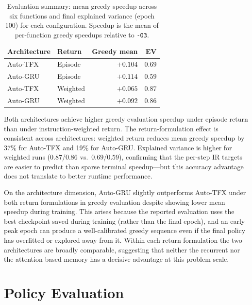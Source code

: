 \documentclass[conference]{IEEEtran}
\newcommand{\opt}[1]{\texttt{-O#1}}
\begin{document}
\begin{table}[t]
\caption{Evaluation summary: mean greedy speedup across six functions and
final explained variance (epoch 100) for each configuration.
Speedup is the mean of per-function greedy speedups relative to \opt{3}.}
\label{tab:arch-comparison}
\centering
\begin{tabular}{llrr}
\toprule
Architecture & Return & Greedy mean & EV \\
\midrule
Auto-TFX & Episode  & $+0.104$ & $0.69$ \\
Auto-GRU & Episode  & $+0.114$ & $0.59$ \\
Auto-TFX & Weighted & $+0.065$ & $0.87$ \\
Auto-GRU & Weighted & $+0.092$ & $0.86$ \\
\bottomrule
\end{tabular}
\end{table}

Both architectures achieve higher greedy evaluation speedup under episode
return than under instruction-weighted return.
The return-formulation effect is consistent across architectures: weighted
return reduces mean greedy speedup by 37\% for Auto-TFX and 19\% for Auto-GRU.
Explained variance is higher for weighted runs ($0.87$/$0.86$ vs.\
$0.69$/$0.59$), confirming that the per-step IR targets are easier to predict
than sparse terminal speedup---but this accuracy advantage does not translate
to better runtime performance.

On the architecture dimension, Auto-GRU slightly outperforms Auto-TFX under
both return formulations in greedy evaluation despite showing lower mean
speedup during training.
This arises because the reported evaluation uses the best checkpoint saved
during training (rather than the final epoch), and an early peak epoch can
produce a well-calibrated greedy sequence even if the final policy has
overfitted or explored away from it.
Within each return formulation the two architectures are broadly comparable,
suggesting that neither the recurrent nor the attention-based memory has a
decisive advantage at this problem scale.

\section{Policy Evaluation}
\end{document}
